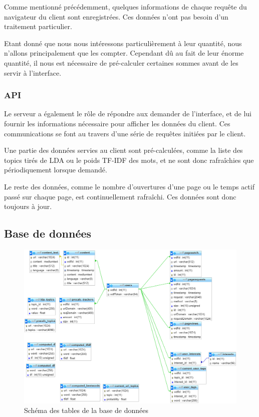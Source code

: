 				Comme mentionné précédemment, quelques informations de chaque requête du navigateur du client sont enregistrées. Ces données n'ont pas besoin d'un traitement particulier.

				Etant donné que nous nous intéressons particulièrement à leur quantité, nous n'allons principalement que les compter. Cependant dû au fait de leur énorme quantité, il nous est nécessaire de pré-calculer certaines sommes avant de les servir à l'interface.

		\subsubsection{API}

			Le serveur a également le rôle de répondre aux demander de l'interface, et de lui fournir les informations nécessaire pour afficher les données du client. Ces communications se font au travers d'une série de requêtes initiées par le client.

			Une partie des données servies au client sont pré-calculées, comme la liste des topics tirés de LDA ou le poids TF-IDF des mots, et ne sont donc rafraîchies que périodiquement lorsque demandé.

			Le reste des données, comme le nombre d'ouvertures d'une page ou le temps actif passé sur chaque page, est continuellement rafraîchi. Ces données sont donc toujours à jour.

	\subsection{Base de données}

		\begin{figure}[!h]
			\centering
			\includegraphics[height=0.8\textwidth]{images/design/db}
			\caption{Schéma des tables de la base de données}
			\label{db}
		\end{figure}


